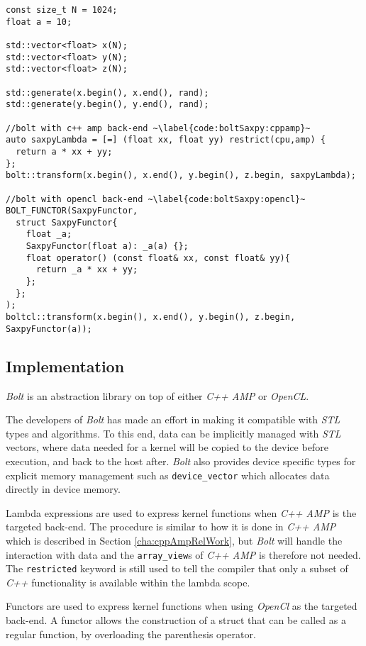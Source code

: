 \begin{lstlisting}[caption={\textit{SAXPY} computation in \textit{Bolt}.}, label={code:boltSaxpy}]
const size_t N = 1024;
float a = 10;

std::vector<float> x(N);
std::vector<float> y(N);
std::vector<float> z(N);

std::generate(x.begin(), x.end(), rand);
std::generate(y.begin(), y.end(), rand);

//bolt with c++ amp back-end ~\label{code:boltSaxpy:cppamp}~
auto saxpyLambda = [=] (float xx, float yy) restrict(cpu,amp) {
  return a * xx + yy;
};
bolt::transform(x.begin(), x.end(), y.begin(), z.begin, saxpyLambda);

//bolt with opencl back-end ~\label{code:boltSaxpy:opencl}~
BOLT_FUNCTOR(SaxpyFunctor,
  struct SaxpyFunctor{
    float _a;
    SaxpyFunctor(float a): _a(a) {};
    float operator() (const float& xx, const float& yy){
      return _a * xx + yy;
    };
  };
);
boltcl::transform(x.begin(), x.end(), y.begin(), z.begin, SaxpyFunctor(a));
\end{lstlisting}

\subsection{Implementation}
\textit{Bolt} is an abstraction library on top of either \textit{C++ AMP} or \textit{OpenCL}.  

The developers of \textit{Bolt} has made an effort in making it compatible with \textit{STL} types and algorithms. To this end, data can be implicitly managed with \textit{STL} vectors, where data needed for a kernel will be copied to the device before execution, and back to the host after. \textit{Bolt} also provides device specific types for explicit memory management such as \texttt{device\_vector} which allocates data directly in device memory.

Lambda expressions are used to express kernel functions when \textit{C++ AMP} is the targeted back-end. The procedure is similar to how it is done in \textit{C++ AMP} which is described in Section \ref{cha:cppAmpRelWork}, but \textit{Bolt} will handle the interaction with data and the \texttt{array\_view}s of \textit{C++ AMP} is therefore not needed. The \texttt{restricted} keyword is still used to tell the compiler that only a subset of \textit{C++} functionality is available within the lambda scope.

Functors are used to express kernel functions when using \textit{OpenCl} as the targeted back-end. A functor allows the construction of a struct that can be called as a regular function, by overloading the parenthesis operator. 

